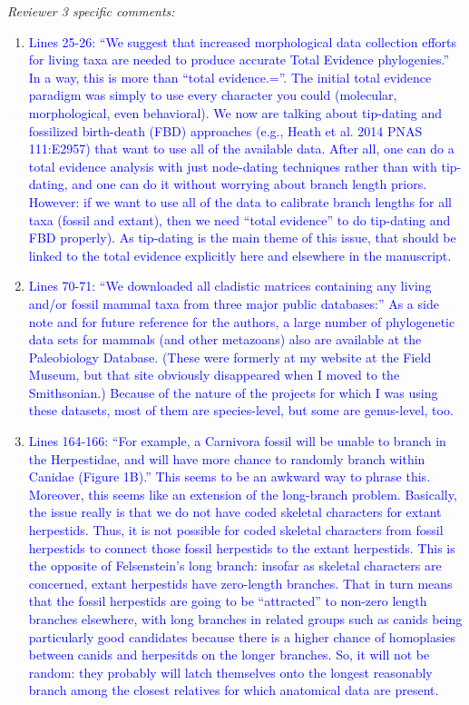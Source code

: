 \documentclass[12pt,letterpaper]{article}
\renewcommand{\subsection}[1]{%
\bigskip
\begin{center}
\begin{large}
\normalfont\itshape #1
\end{large}
\end{center}}
\begin{document}
\subsection{Reviewer 3 specific comments:}
\begin{enumerate}
\item{\textcolor{blue}{Lines 25-26: ``We suggest that increased morphological data collection efforts for living taxa are needed to produce accurate Total Evidence phylogenies.''
In a way, this is more than ``total evidence.=''.
The initial total evidence paradigm was simply to use every character you could (molecular, morphological, even behavioral).
We now are talking about tip-dating and fossilized birth-death (FBD) approaches (e.g., Heath et al. 2014 PNAS 111:E2957) that want to use all of the available data.
After all, one can do a total evidence analysis with just node-dating techniques rather than with tip-dating, and one can do it without worrying about branch length priors.
However: if we want to use all of the data to calibrate branch lengths for all taxa (fossil and extant), then we need ``total evidence'' to do tip-dating and FBD properly).
As tip-dating is the main theme of this issue, that should be linked to the total evidence explicitly here and elsewhere in the manuscript.}}

\item{\textcolor{blue}{Lines 70-71: ``We downloaded all cladistic matrices containing any living and/or fossil mammal  taxa from three major public databases:''
As a side note and for future reference for the authors, a large number of phylogenetic data sets for mammals (and other metazoans) also are available at the Paleobiology Database.
(These were formerly at my website at the Field Museum, but that site obviously disappeared when I moved to the Smithsonian.)
Because of the nature of the projects for which I was using these datasets, most of them are species-level, but some are genus-level, too.}}

\item{\textcolor{blue}{Lines 164-166: ``For example, a Carnivora fossil will be unable to branch in the Herpestidae, and will have more chance to randomly branch within Canidae (Figure 1B).'' 
This seems to be an awkward way to phrase this.
Moreover, this seems like an extension of the long-branch problem.
Basically, the issue really is that we do not have coded skeletal characters for extant herpestids.
Thus, it is not possible for coded skeletal characters from fossil herpestids to connect those fossil herpestids to the extant herpestids.
This is the opposite of Felsenstein’s long branch: insofar as skeletal characters are concerned, extant herpestids have zero-length branches.
That in turn means that the fossil herpestids are going to be ``attracted'' to non-zero length branches elsewhere, with long branches in related groups such as canids being particularly good candidates because there is a higher chance of homoplasies between canids and herpesitds on the longer branches.
So, it will not be random: they probably will latch themselves onto the longest reasonably branch among the closest relatives for which anatomical data are present.}}

\end{enumerate}
\end{document}

